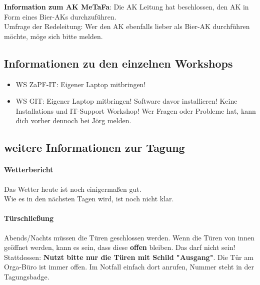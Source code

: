     \textbf{Information zum AK MeTaFa}: Die AK Leitung hat beschlossen, den AK in Form eines Bier-AKs durchzuführen. \\
      Umfrage der Redeleitung: Wer den AK ebenfalls lieber als Bier-AK durchführen möchte, möge sich bitte melden.

    \subsection{Informationen zu den einzelnen Workshops}
      \begin{itemize}
        \item WS ZaPF-IT: Eigener Laptop mitbringen!
        \item WS GIT: Eigener Laptop mitbringen! Software davor installieren! Keine Installations und IT-Support Workshop! Wer Fragen oder Probleme hat, kann dich vorher dennoch bei Jörg melden.
      \end{itemize}

    \subsection{weitere Informationen zur Tagung}
      \paragraph{Wetterbericht}
        Das Wetter heute ist noch einigermaßen gut. \\
        Wie es in den nächsten Tagen wird, ist noch nicht klar.

      \paragraph{Türschließung}
        Abends/Nachts müssen die Türen geschlossen werden.
        Wenn die Türen von innen geöffnet werden, kann es sein, dass diese \textbf{offen} bleiben. Das darf nicht sein! \\
        Stattdessen: \textbf{Nutzt bitte nur die Türen mit Schild "Ausgang"}. Die Tür am Orga-Büro ist immer offen. Im Notfall einfach dort anrufen, Nummer steht in der Tagungsbadge.

